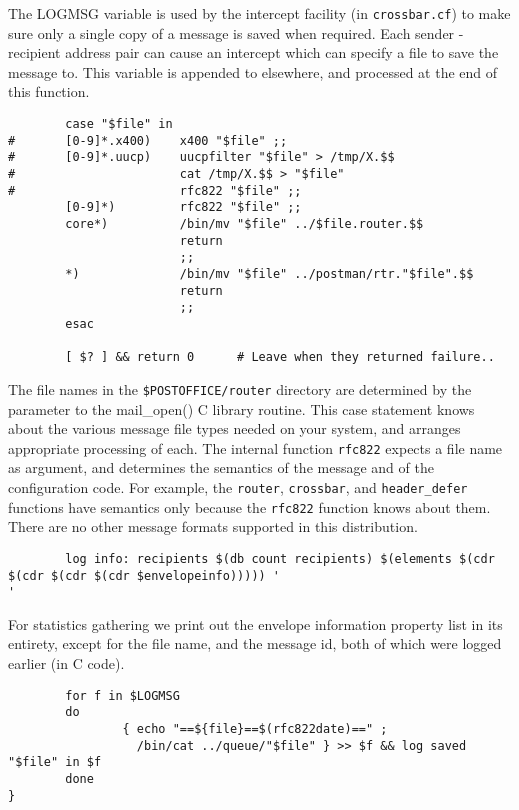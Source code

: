 The LOGMSG variable is used by the intercept facility (in {\tt crossbar.cf})
to make sure only a single copy of a message is saved when required.
Each sender - recipient address pair can cause an intercept which can
specify a file to save the message to.  This variable is appended to
elsewhere, and processed at the end of this function.
\begin{tscreen}
\begin{verbatim}
        case "$file" in
#       [0-9]*.x400)    x400 "$file" ;;
#       [0-9]*.uucp)    uucpfilter "$file" > /tmp/X.$$
#                       cat /tmp/X.$$ > "$file"
#                       rfc822 "$file" ;;
        [0-9]*)         rfc822 "$file" ;;
        core*)          /bin/mv "$file" ../$file.router.$$
                        return
                        ;;
        *)              /bin/mv "$file" ../postman/rtr."$file".$$
                        return
                        ;;
        esac

        [ $? ] && return 0      # Leave when they returned failure..
\end{verbatim}
\end{tscreen}

The file names in the {\tt \$POSTOFFICE/router} directory are determined by
the parameter to the mail\_open() C library routine.  This case
statement knows about the various message file types needed on your
system, and arranges appropriate processing of each.  The internal
function {\tt rfc822} expects a file name as argument, and determines the
semantics of the message and of the configuration code.  For example,
the {\tt router}, {\tt crossbar}, and {\tt header\_defer} functions have semantics only
because the {\tt rfc822} function knows about them.  There are no other
message formats supported in this distribution.
\begin{tscreen}
\begin{verbatim}
        log info: recipients $(db count recipients) $(elements $(cdr $(cdr $(cdr $(cdr $envelopeinfo))))) '
'
\end{verbatim}
\end{tscreen}

For statistics gathering we print out the envelope information property
list in its entirety, except for the file name, and the message id, both
of which were logged earlier (in C code).
\begin{tscreen}
\begin{verbatim}
        for f in $LOGMSG
        do
                { echo "==${file}==$(rfc822date)==" ;
                  /bin/cat ../queue/"$file" } >> $f && log saved "$file" in $f
        done
}
\end{verbatim}
\end{tscreen}


